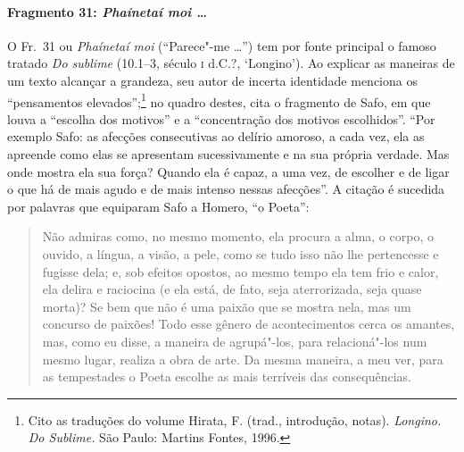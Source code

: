 \paragraph{Fragmento 31: \textit{Phaínetaí moi \ldots{}}}


{\small O Fr.~31 ou \textit{Phaínetaí moi} (“Parece"-me \ldots{}”) tem por fonte
principal o famoso tratado \textit{Do sublime} (10.1--3, século \textsc{i} d.C.?, `Longino'). Ao
explicar as maneiras de um texto alcançar a grandeza, seu autor de incerta identidade menciona os
“pensamentos elevados”;\footnote{ Cito as traduções do volume Hirata,
F. (trad., introdução, notas). \textit{Longino.} \textit{Do Sublime.} São
Paulo: Martins Fontes, 1996.} no quadro destes, cita o fragmento de Safo,
em que louva a “escolha dos motivos” e a “concentração dos
motivos escolhidos”. ``Por exemplo Safo: as afecções consecutivas ao delírio
amoroso, a cada vez, ela as apreende como elas se apresentam sucessivamente e
na sua própria verdade. Mas onde mostra ela sua força? Quando ela é capaz, a
uma vez, de escolher e de ligar o que há de mais agudo e de mais
intenso nessas afecções”. A citação é sucedida por palavras que equiparam Safo
a Homero, “o Poeta”: 

\begin{quote}
Não admiras como, no mesmo momento, ela
procura a alma, o corpo, o ouvido, a língua, a visão, a pele, como se tudo isso
não lhe pertencesse e fugisse dela; e, sob efeitos opostos, ao mesmo tempo ela
tem frio e calor, ela delira e raciocina (e ela está, de fato, seja
aterrorizada, seja quase morta)? Se bem que não é uma paixão que se mostra
nela, mas um concurso de paixões! Todo esse gênero de acontecimentos cerca os
amantes, mas, como eu disse, a maneira de agrupá"-los, para relacioná"-los num
mesmo lugar, realiza a obra de arte. Da mesma maneira, a meu ver, para as
tempestades o Poeta escolhe as mais terríveis das consequências.
\end{quote}

}
